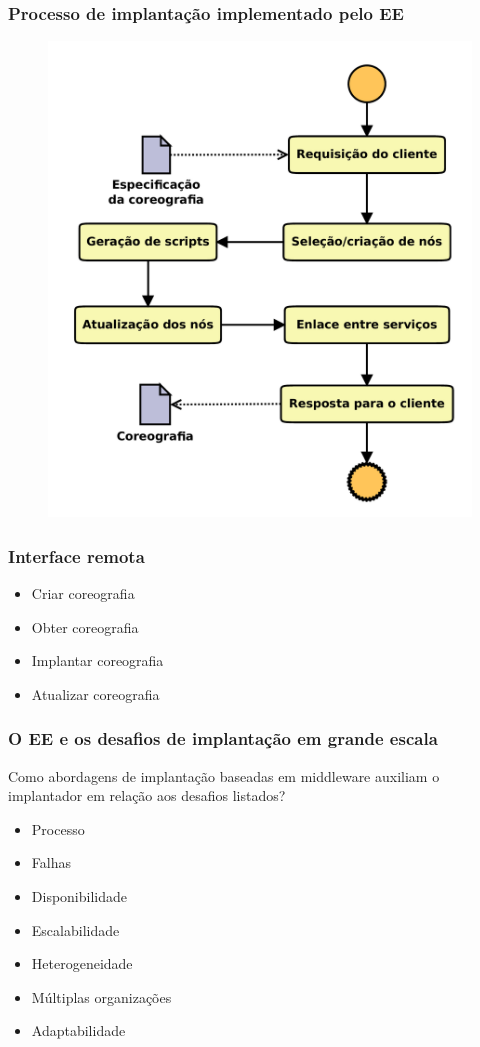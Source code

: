 \documentclass{beamer}
\begin{document}
\begin{frame}
\frametitle{Processo de implantação implementado pelo EE}

\begin{figure}
\includegraphics[width=0.55\linewidth]{img/processo}
\end{figure}

\end{frame}


\begin{frame}
\frametitle{Interface remota}

\begin{itemize}
\item Criar coreografia
\item Obter coreografia
\item Implantar coreografia
\item Atualizar coreografia
\end{itemize}

\end{frame}



\begin{frame}
\frametitle{O EE e os desafios de implantação em grande escala}

Como abordagens de implantação baseadas em middleware auxiliam o implantador em relação aos desafios listados?

\begin{itemize}
\item Processo
\item Falhas
\item Disponibilidade
\item Escalabilidade
\item Heterogeneidade
\item Múltiplas organizações
\item Adaptabilidade
\end{itemize}

\end{frame}
\end{document}
